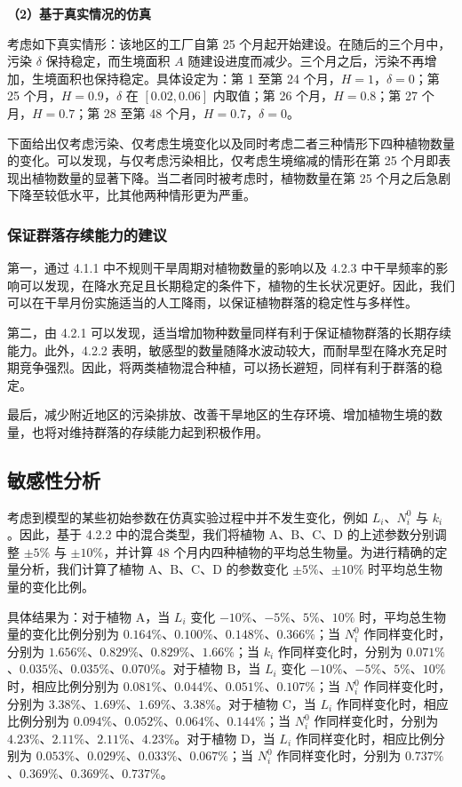 \documentclass[11pt,a4paper]{ctexart}
\begin{document}
\textbf{（2）基于真实情况的仿真}

考虑如下真实情形：该地区的工厂自第 25 个月起开始建设。在随后的三个月中，污染 $\delta$ 保持稳定，而生境面积 $A$ 随建设进度而减少。三个月之后，污染不再增加，生境面积也保持稳定。具体设定为：第 1 至第 24 个月，$H=1$，$\delta=0$；第 25 个月，$H=0.9$，$\delta$ 在 $[0.02,0.06]$ 内取值；第 26 个月，$H=0.8$；第 27 个月，$H=0.7$；第 28 至第 48 个月，$H=0.7$，$\delta=0$。

下面给出仅考虑污染、仅考虑生境变化以及同时考虑二者三种情形下四种植物数量的变化。可以发现，与仅考虑污染相比，仅考虑生境缩减的情形在第 25 个月即表现出植物数量的显著下降。当二者同时被考虑时，植物数量在第 25 个月之后急剧下降至较低水平，比其他两种情形更为严重。

\subsubsection{保证群落存续能力的建议}

第一，通过 4.1.1 中不规则干旱周期对植物数量的影响以及 4.2.3 中干旱频率的影响可以发现，在降水充足且长期稳定的条件下，植物的生长状况更好。因此，我们可以在干旱月份实施适当的人工降雨，以保证植物群落的稳定性与多样性。

第二，由 4.2.1 可以发现，适当增加物种数量同样有利于保证植物群落的长期存续能力。此外，4.2.2 表明，敏感型的数量随降水波动较大，而耐旱型在降水充足时期竞争强烈。因此，将两类植物混合种植，可以扬长避短，同样有利于群落的稳定。

最后，减少附近地区的污染排放、改善干旱地区的生存环境、增加植物生境的数量，也将对维持群落的存续能力起到积极作用。

\subsection{敏感性分析}

考虑到模型的某些初始参数在仿真实验过程中并不发生变化，例如 $L_i$、$N_i^{0}$ 与 $k_i$。因此，基于 4.2.2 中的混合类型，我们将植物 A、B、C、D 的上述参数分别调整 $\pm5\%$ 与 $\pm10\%$，并计算 48 个月内四种植物的平均总生物量。为进行精确的定量分析，我们计算了植物 A、B、C、D 的参数变化 $\pm5\%$、$\pm10\%$ 时平均总生物量的变化比例。

具体结果为：对于植物 A，当 $L_i$ 变化 $-10\%$、$-5\%$、$5\%$、$10\%$ 时，平均总生物量的变化比例分别为 $0.164\%$、$0.100\%$、$0.148\%$、$0.366\%$；当 $N_i^{0}$ 作同样变化时，分别为 $1.656\%$、$0.829\%$、$0.829\%$、$1.66\%$；当 $k_i$ 作同样变化时，分别为 $0.071\%$、$0.035\%$、$0.035\%$、$0.070\%$。对于植物 B，当 $L_i$ 变化 $-10\%$、$-5\%$、$5\%$、$10\%$ 时，相应比例分别为 $0.081\%$、$0.044\%$、$0.051\%$、$0.107\%$；当 $N_i^{0}$ 作同样变化时，分别为 $3.38\%$、$1.69\%$、$1.69\%$、$3.38\%$。对于植物 C，当 $L_i$ 作同样变化时，相应比例分别为 $0.094\%$、$0.052\%$、$0.064\%$、$0.144\%$；当 $N_i^{0}$ 作同样变化时，分别为 $4.23\%$、$2.11\%$、$2.11\%$、$4.23\%$。对于植物 D，当 $L_i$ 作同样变化时，相应比例分别为 $0.053\%$、$0.029\%$、$0.033\%$、$0.067\%$；当 $N_i^{0}$ 作同样变化时，分别为 $0.737\%$、$0.369\%$、$0.369\%$、$0.737\%$。
\end{document}
